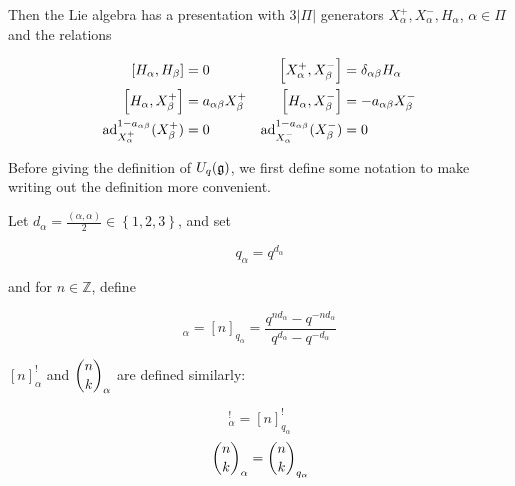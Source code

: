     Then the Lie algebra has a presentation with $3|\Pi|$ generators
    $X^+_\alpha, X^-_\alpha, H_\alpha$, $\alpha \in \Pi$ and the relations 

    \begin{align}
        \left[ H_\alpha, H_\beta \right] &= 0       &   \left[ X^+_\alpha, X^-_\beta \right] &= \delta_{\alpha\beta} H_\alpha \\
        \left[ H_\alpha, X^+_\beta \right] &= a_{\alpha\beta} X^+_\beta  &   \left[ H_\alpha, X^-_\beta \right] &= -a_{\alpha\beta} X^-_\beta  \\
        \operatorname{ad}_{X^+_\alpha}^{1-a_{\alpha\beta}} (X^+_\beta) &= 0 & \operatorname{ad}_{X^-_\alpha}^{1-a_{\alpha\beta}} (X^-_\beta) &= 0 \label{eqn:ad}
    \end{align}

Before giving the definition of $U_q(\mathfrak{g})$, we first define some notation to
make writing out the definition more convenient.

    Let $d_\alpha = \frac{(\alpha,\alpha)}{2} \in \left\{ 1,2,3 \right\}$, and set 

    \begin{equation}
        q_\alpha = q^{d_\alpha}
    \end{equation}

    and for $n \in \mathbb{Z}$, define

    \begin{equation}
        [n]_\alpha = [n]_{q_\alpha} = \frac{q^{nd_\alpha} - q^{-nd_\alpha}}{q^{d_\alpha} - q^{-d_\alpha}}
    \end{equation}

    $[n]_\alpha^!$ and $\dbinom{n}{k}_\alpha$ are defined similarly: 
    
    \begin{equation}
        [n]_\alpha^! = [n]_{q_{\alpha}}^!
    \end{equation}
    \begin{equation}
        \dbinom{n}{k}_\alpha = \dbinom{n}{k}_{q_\alpha}
    \end{equation}

